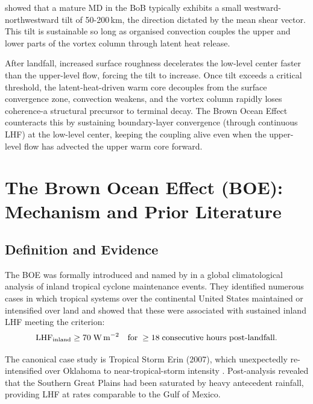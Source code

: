 \autocite{rashid2005track} showed that a mature MD in the BoB typically
exhibits a small westward-northwestward tilt of 50-200\,km, the
direction dictated by the mean shear vector. This tilt is sustainable
so long as organised convection couples the upper and lower parts of
the vortex column through latent heat release.

After landfall, increased surface roughness decelerates the low-level
center faster than the upper-level flow, forcing the tilt to
increase. Once tilt exceeds a critical threshold, the
latent-heat-driven warm core decouples from the surface convergence
zone, convection weakens, and the vortex column rapidly loses
coherence-a structural precursor to terminal decay. The Brown Ocean
Effect counteracts this by sustaining boundary-layer convergence
(through continuous LHF) at the low-level center, keeping the
coupling alive even when the upper-level flow has advected the upper
warm core forward.

\section{The Brown Ocean Effect (BOE)\texorpdfstring{:}{} Mechanism and Prior Literature}
\label{sec:boe_literature}

\subsection{Definition and Evidence}
\label{subsec:boe_original}

The BOE was formally introduced and named by \autocite{andersen2013} in a global
climatological analysis of inland tropical cyclone maintenance events. They
identified numerous cases in which tropical systems over the continental United
States maintained or intensified over land and showed that these were associated
with sustained inland LHF meeting the criterion:
\begin{equation}
  \text{LHF}_{\text{inland}} \geq 70\;\text{W\,m}^{-2}
  \quad\text{for}\;\geq 18\;\text{consecutive hours post-landfall.}
  \label{eq:boe_def}
\end{equation}

The canonical case study is Tropical Storm Erin (2007), which
unexpectedly re-intensified over Oklahoma to near-tropical-storm
intensity \autocite{andersen2014insights}. Post-analysis revealed that
the Southern Great Plains had been saturated by heavy antecedent
rainfall, providing LHF at rates comparable to the Gulf of Mexico.

